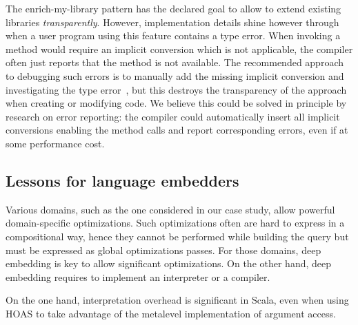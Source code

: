 The enrich-my-library pattern has the declared goal to allow to extend existing libraries \emph{transparently}. However, implementation details shine however through when a user program using this feature contains a type error. When invoking a method would require an implicit conversion which is not applicable, the compiler often just reports that the method is not available. The recommended approach to debugging such errors is to manually add the missing implicit conversion and investigating the type error~\citep[Ch.~21.8]{Odersky11book}, but this destroys the transparency of the approach when creating or modifying code.
 We believe this could be solved in principle by research on error reporting: the compiler could automatically insert all implicit conversions enabling the method calls and report corresponding errors, even if at some performance cost.



\subsection{Lessons for language embedders}
Various domains, such as the one considered in our case study, allow powerful domain-specific optimizations. Such optimizations often are hard to express in a compositional way, hence they cannot be performed while building the query but must be expressed as global optimizations passes.
For those domains, deep embedding is key to allow significant optimizations.
On the other hand, deep embedding requires to implement an interpreter or a compiler.

On the one hand, interpretation overhead is significant in Scala, even when
using HOAS to take advantage of the metalevel implementation of argument access.

